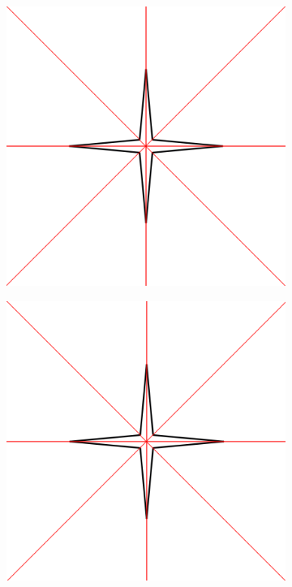 \documentclass[11pt]{article}
\begin{document}
\begin{figure}[H]
\begin{subfigure}[b]{0.18\textwidth}
    \includegraphics[width=\textwidth]{FIGS/Part4/s11}
     \caption{}
     \label{fig:s11}
  \end{subfigure}
    \begin{subfigure}[b]{0.18\textwidth}
    \includegraphics[width=\textwidth]{FIGS/Part4/s12}

\end{subfigure}
\end{figure}
\end{document}
